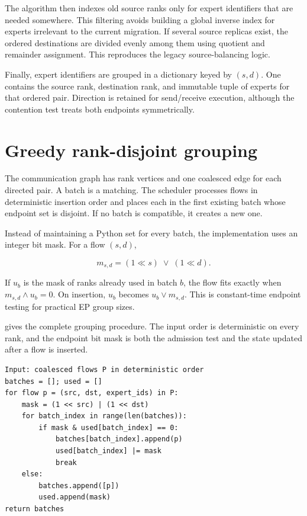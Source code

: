 The algorithm then indexes old source ranks only for expert identifiers that
are needed somewhere. This filtering avoids building a global inverse index
for experts irrelevant to the current migration. If several source replicas
exist, the ordered destinations are divided evenly among them using quotient
and remainder assignment. This reproduces the legacy source-balancing logic.

Finally, expert identifiers are grouped in a dictionary keyed by
$(s,d)$. One  contains the source rank, destination rank,
and immutable tuple of experts for that ordered pair. Direction is retained for
send/receive execution, although the contention test treats both endpoints
symmetrically.

\section{Greedy rank-disjoint grouping}

The communication graph has rank vertices and one coalesced edge for each
directed pair. A batch is a matching. The scheduler processes flows in
deterministic insertion order and places each in the first existing batch whose
endpoint set is disjoint. If no batch is compatible, it creates a new one.

Instead of maintaining a Python set for every batch, the implementation uses an
integer bit mask. For a flow $(s,d)$,

\begin{equation}
  m_{s,d}=(1\ll s)\;\lor\;(1\ll d).
\end{equation}

If $u_b$ is the mask of ranks already used in batch $b$, the flow fits exactly
when $m_{s,d}\land u_b=0$. On insertion, $u_b$ becomes
$u_b\lor m_{s,d}$. This is constant-time endpoint testing for practical EP
group sizes.

 gives the complete grouping procedure. The input order is
deterministic on every rank, and the endpoint bit mask is both the admission
test and the state updated after a flow is inserted.

\begin{algorithm}[t]
  \caption{Deterministic first-fit migration batching}
  \label{alg:greedy}
\begin{lstlisting}[style=code,mathescape=true]
Input: coalesced flows P in deterministic order
batches = []; used = []
for flow p = (src, dst, expert_ids) in P:
    mask = (1 << src) | (1 << dst)
    for batch_index in range(len(batches)):
        if mask & used[batch_index] == 0:
            batches[batch_index].append(p)
            used[batch_index] |= mask
            break
    else:
        batches.append([p])
        used.append(mask)
return batches
\end{lstlisting}
\end{algorithm}

